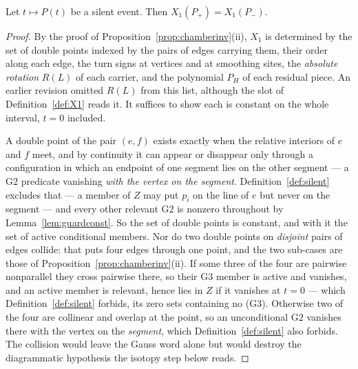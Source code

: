 \begin{lemma}\label{lem:silence}
Let $t\mapsto P(t)$ be a silent event. Then $X_1(P_+)=X_1(P_-)$.
\end{lemma}
\begin{proof}
By the proof of Proposition~\ref{prop:chamberinv}(ii), $X_1$ is determined by the
set of double points indexed by the pairs of edges carrying them, their order
along each edge, the turn signs at vertices and at smoothing sites, the
\emph{absolute rotation} $R(L)$ of each carrier, and the polynomial $P_H$ of each
residual piece. An earlier revision omitted $R(L)$ from this list,
although the slot of Definition~\ref{def:X1} reads it. It suffices to show each is
constant on the whole interval, $t=0$ included.

A double point of the pair $(e,f)$ exists exactly when the relative interiors of
$e$ and $f$ meet, and by continuity it can appear or disappear only through a
configuration in which an endpoint of one segment lies on the other segment ---
a $\mathrm{G2}$ predicate vanishing \emph{with the vertex on the segment}.
Definition~\ref{def:silent} excludes that --- a member of $Z$ may put $p_i$ on
the line of $e$ but never on the segment --- and every other relevant
$\mathrm{G2}$ is nonzero throughout by Lemma~\ref{lem:guardconst}.
So the set of double points is constant, and with it the set of active
conditional members. Nor do two double points on \emph{disjoint} pairs of edges collide: that puts
four edges through one point, and the two sub-cases are those of
Proposition~\ref{prop:chamberinv}(ii). If some three of the four are pairwise
nonparallel they cross pairwise there, so their $\mathrm{G3}$ member is active
and vanishes, and an active member is relevant, hence lies in $Z$ if it
vanishes at $t=0$ --- which Definition~\ref{def:silent} forbids, its zero sets
containing no (G3). Otherwise two of the four are collinear and overlap at the
point, so an unconditional $\mathrm{G2}$ vanishes there with the vertex on the
\emph{segment}, which Definition~\ref{def:silent} also forbids.
The collision would leave the Gauss word alone but would destroy the
diagrammatic hypothesis the isotopy step below reads.


\end{proof}
